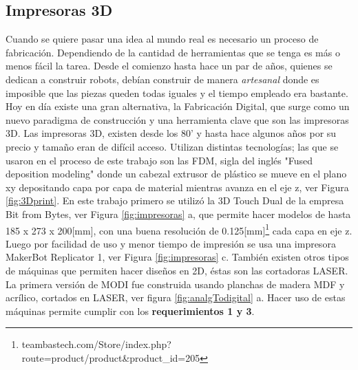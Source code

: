 \subsection{Impresoras 3D}
Cuando se quiere pasar una idea al mundo real es necesario un proceso de fabricación. Dependiendo de la cantidad de herramientas que se tenga es más o menos fácil la tarea. Desde el comienzo hasta hace un par de años, quienes se dedican a construir robots, debían construir de manera \textit{artesanal} donde es imposible que las piezas queden todas iguales y el tiempo empleado era bastante. Hoy en día existe una gran alternativa, la Fabricación Digital, que surge como un nuevo paradigma de construcción y una herramienta clave que son las impresoras 3D. Las impresoras 3D, existen desde los 80' y hasta hace algunos años por su precio y tamaño eran de difícil acceso. Utilizan distintas tecnologías; las que se usaron en el proceso de este trabajo son las FDM, sigla del inglés "Fused deposition modeling" donde un cabezal extrusor de plástico se mueve en el plano xy depositando capa por capa de material mientras avanza en el eje z, ver Figura \ref{fig:3Dprint}. En este trabajo primero se utilizó la 3D Touch Dual de la empresa Bit from Bytes, ver Figura \ref{fig:impresoras} a, que permite hacer modelos de hasta 185 x 273 x 200[mm], con una buena resolución de 0.125[mm]\footnote{teambastech.com/Store/index.php?route=product/product\&product\_id=205} cada capa en eje z. Luego por facilidad de uso y menor tiempo de impresión se usa una impresora MakerBot Replicator 1, ver Figura \ref{fig:impresoras} c. También existen otros tipos de máquinas que permiten hacer diseños en 2D, éstas son las cortadoras LASER. La primera versión de MODI fue construida usando planchas de madera MDF y acrílico, cortados en LASER, ver figura \ref{fig:analgTodigital} a. Hacer uso de estas máquinas permite cumplir con los \textbf{requerimientos 1 y 3}.

